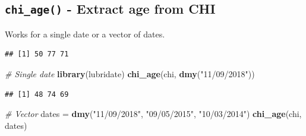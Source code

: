 \documentclass[
]{book}
\newenvironment{Shaded}{\begin{snugshade}}{\end{snugshade}}
\newcommand{\CommentTok}[1]{\textcolor[rgb]{0.56,0.35,0.01}{\textit{#1}}}
\newcommand{\ControlFlowTok}[1]{\textcolor[rgb]{0.13,0.29,0.53}{\textbf{#1}}}
\newcommand{\DataTypeTok}[1]{\textcolor[rgb]{0.13,0.29,0.53}{#1}}
\newcommand{\DecValTok}[1]{\textcolor[rgb]{0.00,0.00,0.81}{#1}}
\newcommand{\KeywordTok}[1]{\textcolor[rgb]{0.13,0.29,0.53}{\textbf{#1}}}
\newcommand{\NormalTok}[1]{#1}
\newcommand{\OperatorTok}[1]{\textcolor[rgb]{0.81,0.36,0.00}{\textbf{#1}}}
\newcommand{\StringTok}[1]{\textcolor[rgb]{0.31,0.60,0.02}{#1}}
\begin{document}
\hypertarget{chi_age---extract-age-from-chi}{%
\subsection{\texorpdfstring{\texttt{chi\_age()} - Extract age from CHI}{chi\_age() - Extract age from CHI}}\label{chi_age---extract-age-from-chi}}

Works for a single date or a vector of dates.

\begin{Shaded}
\end{Shaded}

\begin{verbatim}
## [1] 50 77 71
\end{verbatim}

\begin{Shaded}
\begin{Highlighting}[]
\CommentTok{# Single date}
\KeywordTok{library}\NormalTok{(lubridate)}
\KeywordTok{chi_age}\NormalTok{(chi, }\KeywordTok{dmy}\NormalTok{(}\StringTok{"11/09/2018"}\NormalTok{))}
\end{Highlighting}
\end{Shaded}

\begin{verbatim}
## [1] 48 74 69
\end{verbatim}

\begin{Shaded}
\begin{Highlighting}[]
\CommentTok{# Vector}
\NormalTok{dates =}\StringTok{ }\KeywordTok{dmy}\NormalTok{(}\StringTok{"11/09/2018"}\NormalTok{,}
            \StringTok{"09/05/2015"}\NormalTok{,}
            \StringTok{"10/03/2014"}\NormalTok{)}
\KeywordTok{chi_age}\NormalTok{(chi, dates)}
\end{Highlighting}
\end{Shaded}
\end{document}
